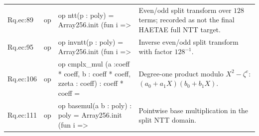 \documentclass[10pt]{article}
\begin{document}
\begin{longtable}{L{0.11\textwidth}L{0.05\textwidth}L{0.38\textwidth}L{0.42\textwidth}}
Rq.\allowbreak{}ec:\allowbreak{}89 & op & {\ttfamily\scriptsize op ntt(p : poly) = Array256.init (fun i =>} & Even/odd split transform over $128$ terms; recorded as not the final HAETAE full NTT target. \\
Rq.\allowbreak{}ec:\allowbreak{}95 & op & {\ttfamily\scriptsize op invntt(p : poly) = Array256.init (fun i =>} & Inverse even/odd split transform with factor $128^{-1}$. \\
Rq.\allowbreak{}ec:\allowbreak{}106 & op & {\ttfamily\scriptsize op cmplx\_mul (a :coeff * coeff, b : coeff * coeff, zzeta : coeff) : coeff * coeff =} & Degree-one product modulo $X^2-\zeta^e$: $(a_0+a_1X)(b_0+b_1X)$. \\
Rq.\allowbreak{}ec:\allowbreak{}111 & op & {\ttfamily\scriptsize op basemul(a b : poly) :  poly = Array256.init (fun i =>} & Pointwise base multiplication in the split NTT domain. \\
\bottomrule
\end{longtable}
\end{document}
